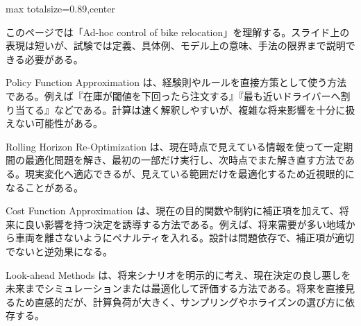 \begin{minipage}[t]{0.58\textwidth}
\begin{adjustbox}{max totalsize={\textwidth}{0.89\textheight},center}
\begin{minipage}{\textwidth}\scriptsize
{}このページでは「Ad-hoc control of bike relocation」を理解する。スライド上の表現は短いが、試験では定義、具体例、モデル上の意味、手法の限界まで説明できる必要がある。\par
Policy Function Approximation は、経験則やルールを直接方策として使う方法である。例えば『在庫が閾値を下回ったら注文する』『最も近いドライバーへ割り当てる』などである。計算は速く解釈しやすいが、複雑な将来影響を十分に扱えない可能性がある。\par
Rolling Horizon Re-Optimization は、現在時点で見えている情報を使って一定期間の最適化問題を解き、最初の一部だけ実行し、次時点でまた解き直す方法である。現実変化へ適応できるが、見えている範囲だけを最適化するため近視眼的になることがある。\par
Cost Function Approximation は、現在の目的関数や制約に補正項を加えて、将来に良い影響を持つ決定を誘導する方法である。例えば、将来需要が多い地域から車両を離さないようにペナルティを入れる。設計は問題依存で、補正項が適切でないと逆効果になる。\par
Look-ahead Methods は、将来シナリオを明示的に考え、現在決定の良し悪しを未来までシミュレーションまたは最適化して評価する方法である。将来を直接見るため直感的だが、計算負荷が大きく、サンプリングやホライズンの選び方に依存する。\par

\end{minipage}
\end{adjustbox}
\end{minipage}
